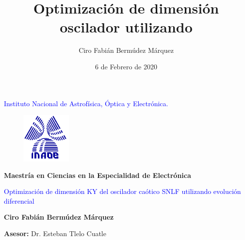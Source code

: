 \documentclass[10pt]{beamer}
\author{Ciro Fabián Bermúdez Márquez}
\title{Optimización de dimensión oscilador utilizando }
\institute{Benemérita Universidad Autónoma de Puebla} \date{6 de Febrero de 2020}
\begin{document}
	\begin{frame}[plain]
	
		
		\begin{center}
			\textcolor{blue}{Instituto Nacional de Astrofísica, Óptica y Electrónica.}
		\end{center}
		
		\begin{figure}[hbtp]
			\centering
			\includegraphics[width = 2.5cm]{logoinaoe.png} 
		\end{figure}
		
		\begin{center}
			\textbf{Maestría en Ciencias en la Especialidad de Electrónica}
		\end{center}
						
		\begin{center}
			\begin{Large}
			\textcolor{blue}{Optimización de dimensión KY del oscilador caótico SNLF  utilizando evolución diferencial}
			\end{Large}
		\end{center}
		
		\begin{center}
			\textbf{Ciro Fabián Bermúdez Márquez }
		\end{center}
		
		\begin{center}
			\textbf{Asesor:} Dr. Esteban Tlelo Cuatle
		\end{center}
	\end{frame}
	\begin{frame}
		\tableofcontents
	\end{frame}
\end{document}
